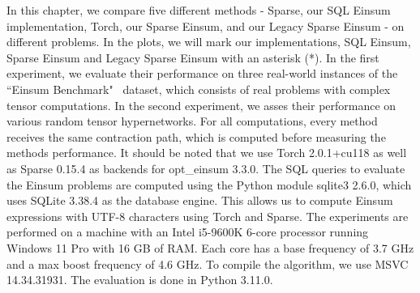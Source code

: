 
In this chapter, we compare five different methods - Sparse, our SQL Einsum implementation, Torch,
our Sparse Einsum, and our Legacy Sparse Einsum - on different problems. In the plots, we will mark
our implementations, SQL Einsum, Sparse Einsum and Legacy Sparse Einsum with an asterisk (*). In the
first experiment, we evaluate their performance on three real-world instances of the
``Einsum Benchmark"~\cite{einsum_benchmark} dataset, which consists of real problems with complex
tensor computations. In the second experiment, we asses their performance on various random tensor
hypernetworks. For all computations, every method receives the same contraction path, which is computed
before measuring the methods performance. It should be noted that we use Torch 2.0.1+cu118 as well
as Sparse 0.15.4 as backends for opt\_einsum 3.3.0. The SQL queries to evaluate the Einsum problems
are computed using the Python module sqlite3 2.6.0, which uses SQLite 3.38.4 as the database engine.
This allows us to compute Einsum expressions with UTF-8 characters using Torch and Sparse. The
experiments are performed on a machine with an Intel i5-9600K 6-core processor running Windows 11
Pro with 16 GB of RAM. Each core has a base frequency of 3.7 GHz and a max boost frequency of 4.6 GHz.
To compile the algorithm, we use MSVC 14.34.31931. The evaluation is done in Python 3.11.0.


